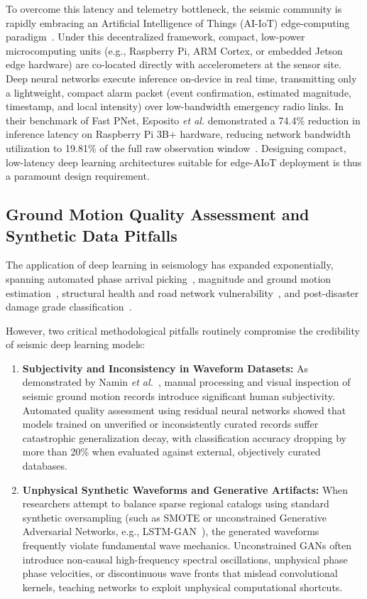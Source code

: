 \documentclass[journal]{IEEEtran}
\begin{document}
To overcome this latency and telemetry bottleneck, the seismic community is rapidly embracing an Artificial Intelligence of Things (AI-IoT) edge-computing paradigm~\cite{esposito2025aiot, ahamad2025deep}. Under this decentralized framework, compact, low-power microcomputing units (e.g., Raspberry Pi, ARM Cortex, or embedded Jetson edge hardware) are co-located directly with accelerometers at the sensor site. Deep neural networks execute inference on-device in real time, transmitting only a lightweight, compact alarm packet (event confirmation, estimated magnitude, timestamp, and local intensity) over low-bandwidth emergency radio links. In their benchmark of Fast PNet, Esposito \textit{et al.} demonstrated a 74.4\% reduction in inference latency on Raspberry Pi 3B+ hardware, reducing network bandwidth utilization to 19.81\% of the full raw observation window~\cite{esposito2025aiot}. Designing compact, low-latency deep learning architectures suitable for edge-AIoT deployment is thus a paramount design requirement.

\subsection{Ground Motion Quality Assessment and Synthetic Data Pitfalls}
The application of deep learning in seismology has expanded exponentially, spanning automated phase arrival picking~\cite{mousavi2020earthquake, perol2018convolutional}, magnitude and ground motion estimation~\cite{meier2019reliable, munchmeyer2021transformer}, structural health and road network vulnerability~\cite{silvalopez2022deep, xie2024deep}, and post-disaster damage grade classification~\cite{panda2025earthquake}. 

However, two critical methodological pitfalls routinely compromise the credibility of seismic deep learning models:
\begin{enumerate}
    \item \textbf{Subjectivity and Inconsistency in Waveform Datasets:} As demonstrated by Namin \textit{et al.}~\cite{namin2024automating}, manual processing and visual inspection of seismic ground motion records introduce significant human subjectivity. Automated quality assessment using residual neural networks showed that models trained on unverified or inconsistently curated records suffer catastrophic generalization decay, with classification accuracy dropping by more than 20\% when evaluated against external, objectively curated databases.
    \item \textbf{Unphysical Synthetic Waveforms and Generative Artifacts:} When researchers attempt to balance sparse regional catalogs using standard synthetic oversampling (such as SMOTE or unconstrained Generative Adversarial Networks, e.g., LSTM-GAN~\cite{chaudhary2025innovative}), the generated waveforms frequently violate fundamental wave mechanics. Unconstrained GANs often introduce non-causal high-frequency spectral oscillations, unphysical phase phase velocities, or discontinuous wave fronts that mislead convolutional kernels, teaching networks to exploit unphysical computational shortcuts.
\end{enumerate}
\end{document}
